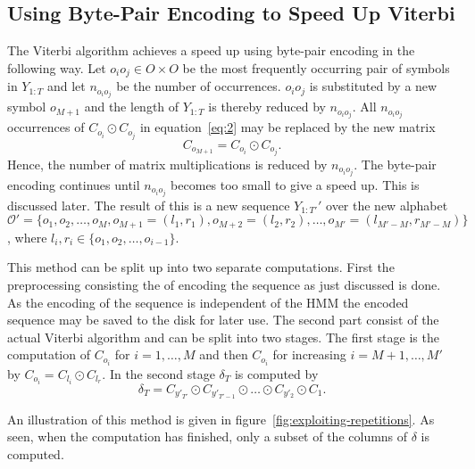 \subsection{Using Byte-Pair Encoding to Speed Up Viterbi}
\label{sec:using-byte-pair}

The Viterbi algorithm achieves a speed up using byte-pair encoding in the
following way. Let $o_i o_j \in O \times O$ be the most frequently occurring
pair of symbols in $Y_{1:T}$ and let $n_{o_i o_j}$ be the number of
occurrences. $o_i o_j$ is substituted by a new symbol $o_{M + 1}$ and the length
of $Y_{1:T}$ is thereby reduced by $n_{o_i o_j}$. All $n_{o_i o_j}$ occurrences
of $C_{o_i} \odot C_{o_j}$ in equation~\eqref{eq:2} may be replaced by the new
matrix
\begin{equation}
  \label{eq:7}
  C_{o_{M + 1}} = C_{o_i} \odot C_{o_j}.
\end{equation}
Hence, the number of matrix multiplications is reduced by $n_{o_i o_j}$. The
byte-pair encoding continues until $n_{o_i o_j}$ becomes too small to give a
speed up. This is discussed later. The result of this is a new sequence
$Y_{1:T'}'$ over the new alphabet
$\mathcal{O}' = \{o_1, o_2, \dots, o_M, o_{M + 1} = (l_1, r_1), o_{M + 2} =
(l_2, r_2), \dots, o_{M'} = (l_{M' - M}, r_{M' - M}) \}$,
where $l_i, r_i \in \{o_1, o_2, \dots, o_{i - 1} \}$.

This method can be split up into two separate computations. First the
preprocessing consisting the of encoding the sequence as just discussed is
done. As the encoding of the sequence is independent of the HMM the encoded
sequence may be saved to the disk for later use. The second part consist of the
actual Viterbi algorithm and can be split into two stages. The first stage is
the computation of $C_{o_i}$ for $i = 1, \dots, M$ and then $C_{o_i}$ for
increasing $i = M + 1, \dots, M'$ by $C_{o_i} = C_{l_i} \odot C_{l_r}$. In the
second stage $\delta_T$ is computed by
\begin{equation}
  \label{eq:3}
  \delta_T = C_{y'_{T'}} \odot C_{y'_{T'-1}} \odot \dots \odot C_{y'_2} \odot C_1.
\end{equation}

An illustration of this method is given in
figure~\ref{fig:exploiting-repetitions}. As seen, when the computation has
finished, only a subset of the columns of $\delta$ is computed.

